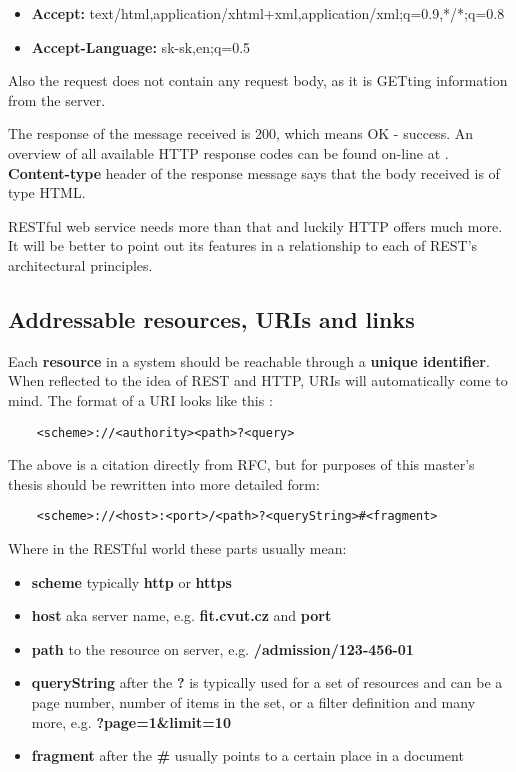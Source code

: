 	\begin{itemize}
	  \item \textbf{Accept:} text/html,application/xhtml+xml,application/xml;q=0.9,*/*;q=0.8
	  \item \textbf{Accept-Language:} sk-sk,en;q=0.5
	\end{itemize}
	
	Also the request does not contain any request body, as it is GETting information from the server. 
	
	The response of the message received is 200, which means OK - success. An overview of all available HTTP response codes
	can be found on-line at \cite{httpcodes}. \textbf{Content-type} header of the response message says that the body
	received is of type HTML.
	
	RESTful web service needs more than that and luckily \gls{HTTP} offers much more. It will be better to point out its
	features in a relationship to each of REST's architectural principles.
	
	\subsection{Addressable resources, URIs and links}
	
	Each \textbf{resource} in a system should be reachable through a \textbf{unique identifier}. When reflected to the idea
	of REST and HTTP, URIs will automatically come to mind. The format of a URI looks like this \cite{uri}:
	
	\begin{verbatim}
	<scheme>://<authority><path>?<query>
	\end{verbatim}
	
	The above is a citation directly from RFC, but for purposes of this master's thesis should be rewritten into more
	detailed form:
	
	\begin{verbatim}
	<scheme>://<host>:<port>/<path>?<queryString>#<fragment>
	\end{verbatim}
	
	Where in the RESTful world these parts usually mean:
	\begin{itemize}
	  \item \textbf{scheme} typically \textbf{http} or \textbf{https}
	  \item \textbf{host} aka server name, e.g. \textbf{fit.cvut.cz} and \textbf{port}
	  \item \textbf{path} to the resource on server, e.g. \textbf{/admission/123-456-01}
	  \item \textbf{queryString} after the \textbf{?} is typically used for a set of resources and can be a page number,
	  number of items in the set, or a filter definition and many more, e.g. \textbf{?page=1\&limit=10}
	  \item \textbf{fragment} after the \textbf{\#} usually points to a certain place in a document
	\end{itemize}
	
